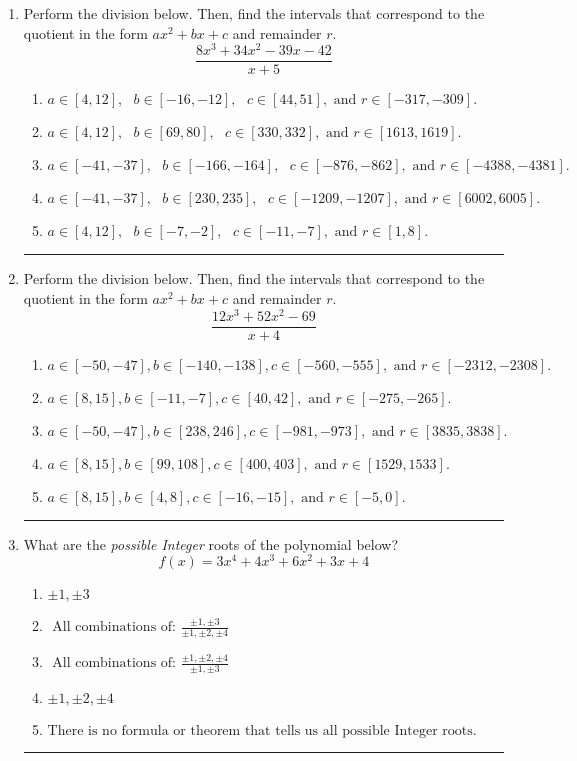 \documentclass[14pt]{extbook}
\newcommand{\litem}[1]{\item#1\hspace*{-1cm}\rule{\textwidth}{0.4pt}}
\begin{document}
\begin{enumerate}
{\begin{enumerate}[label=\Alph*.]
\end{enumerate} }
\litem{
Perform the division below. Then, find the intervals that correspond to the quotient in the form $ax^2+bx+c$ and remainder $r$.\[ \frac{8x^{3} +34 x^{2} -39 x -42}{x + 5} \]\begin{enumerate}[label=\Alph*.]
\item \( a \in [4, 12], \text{   } b \in [-16, -12], \text{   } c \in [44, 51], \text{   and   } r \in [-317, -309]. \)
\item \( a \in [4, 12], \text{   } b \in [69, 80], \text{   } c \in [330, 332], \text{   and   } r \in [1613, 1619]. \)
\item \( a \in [-41, -37], \text{   } b \in [-166, -164], \text{   } c \in [-876, -862], \text{   and   } r \in [-4388, -4381]. \)
\item \( a \in [-41, -37], \text{   } b \in [230, 235], \text{   } c \in [-1209, -1207], \text{   and   } r \in [6002, 6005]. \)
\item \( a \in [4, 12], \text{   } b \in [-7, -2], \text{   } c \in [-11, -7], \text{   and   } r \in [1, 8]. \)

\end{enumerate} }
\litem{
Perform the division below. Then, find the intervals that correspond to the quotient in the form $ax^2+bx+c$ and remainder $r$.\[ \frac{12x^{3} +52 x^{2} -69}{x + 4} \]\begin{enumerate}[label=\Alph*.]
\item \( a \in [-50, -47], b \in [-140, -138], c \in [-560, -555], \text{ and } r \in [-2312, -2308]. \)
\item \( a \in [8, 15], b \in [-11, -7], c \in [40, 42], \text{ and } r \in [-275, -265]. \)
\item \( a \in [-50, -47], b \in [238, 246], c \in [-981, -973], \text{ and } r \in [3835, 3838]. \)
\item \( a \in [8, 15], b \in [99, 108], c \in [400, 403], \text{ and } r \in [1529, 1533]. \)
\item \( a \in [8, 15], b \in [4, 8], c \in [-16, -15], \text{ and } r \in [-5, 0]. \)

\end{enumerate} }
\litem{
What are the \textit{possible Integer} roots of the polynomial below?\[ f(x) = 3x^{4} +4 x^{3} +6 x^{2} +3 x + 4 \]\begin{enumerate}[label=\Alph*.]
\item \( \pm 1,\pm 3 \)
\item \( \text{ All combinations of: }\frac{\pm 1,\pm 3}{\pm 1,\pm 2,\pm 4} \)
\item \( \text{ All combinations of: }\frac{\pm 1,\pm 2,\pm 4}{\pm 1,\pm 3} \)
\item \( \pm 1,\pm 2,\pm 4 \)
\item \( \text{There is no formula or theorem that tells us all possible Integer roots.} \)


\end{enumerate}}
\end{enumerate}
\end{document}
